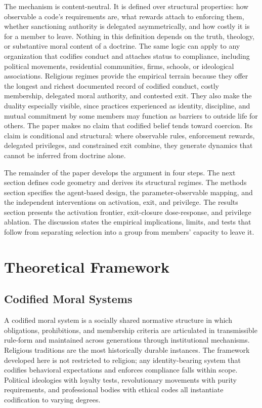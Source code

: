 \documentclass[12pt]{article}
\begin{document}
The mechanism is content-neutral. It is defined over structural properties: how observable a code's requirements are, what rewards attach to enforcing them, whether sanctioning authority is delegated asymmetrically, and how costly it is for a member to leave. Nothing in this definition depends on the truth, theology, or substantive moral content of a doctrine. The same logic can apply to any organization that codifies conduct and attaches status to compliance, including political movements, residential communities, firms, schools, or ideological associations. Religious regimes provide the empirical terrain because they offer the longest and richest documented record of codified conduct, costly membership, delegated moral authority, and contested exit. They also make the duality especially visible, since practices experienced as identity, discipline, and mutual commitment by some members may function as barriers to outside life for others. The paper makes no claim that codified belief tends toward coercion. Its claim is conditional and structural: where observable rules, enforcement rewards, delegated privileges, and constrained exit combine, they generate dynamics that cannot be inferred from doctrine alone.

The remainder of the paper develops the argument in four steps. The next section defines code geometry and derives its structural regimes. The methods section specifies the agent-based design, the parameter-observable mapping, and the independent interventions on activation, exit, and privilege. The results section presents the activation frontier, exit-closure dose-response, and privilege ablation. The discussion states the empirical implications, limits, and tests that follow from separating selection into a group from members' capacity to leave it.


\section{Theoretical Framework}

\subsection{Codified Moral Systems}

A codified moral system is a socially shared normative structure in which obligations, prohibitions, and membership criteria are articulated in transmissible rule-form and maintained across generations through institutional mechanisms. Religious traditions are the most historically durable instances. The framework developed here is not restricted to religion; any identity-bearing system that codifies behavioral expectations and enforces compliance falls within scope. Political ideologies with loyalty tests, revolutionary movements with purity requirements, and professional bodies with ethical codes all instantiate codification to varying degrees.
\end{document}
